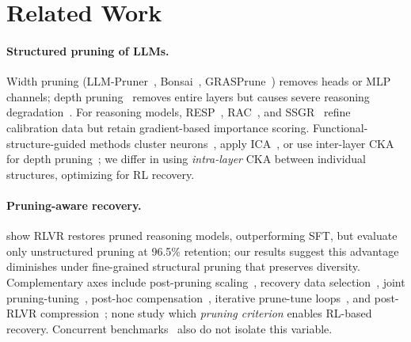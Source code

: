 \section{Related Work}
\label{sec:related}

\paragraph{Structured pruning of LLMs.}
Width pruning (LLM-Pruner~\citep{llmpruner2023}, Bonsai~\citep{bonsai2025}, GRASPrune~\citep{graspprune2026}) removes heads or MLP channels; depth pruning~\citep{shortgpt2024,slicegpt2024} removes entire layers but causes severe reasoning degradation~\citep{shrestha2026layerpruninglimits,llms2lrms2026}.
For reasoning models, RESP~\citep{resp2025}, RAC~\citep{rac2025}, and SSGR~\citep{ssgr2025} refine calibration data but retain gradient-based importance scoring.
Functional-structure-guided methods cluster neurons~\citep{fang_2025}, apply ICA~\citep{funcnet_2025}, or use inter-layer CKA for depth pruning~\citep{mpruner2024,kornblith2019cka}; we differ in using \emph{intra-layer} CKA between individual structures, optimizing for RL recovery.

\paragraph{Pruning-aware recovery.}
\citet{selfhealing2025} show RLVR restores pruned reasoning models, outperforming SFT, but evaluate only unstructured pruning at 96.5\% retention; our results suggest this advantage diminishes under fine-grained structural pruning that preserves diversity.
Complementary axes include post-pruning scaling~\citep{p2law2025}, recovery data selection~\citep{paser2025}, joint pruning-tuning~\citep{pat2025}, post-hoc compensation~\citep{restorelcc_2025}, iterative prune-tune loops~\citep{boiling_frog_2026}, and post-RLVR compression~\citep{opsd2026}; none study which \emph{pruning criterion} enables RL-based recovery.
Concurrent benchmarks~\citep{li2025reasoning_compression,canpruning2025} also do not isolate this variable.

